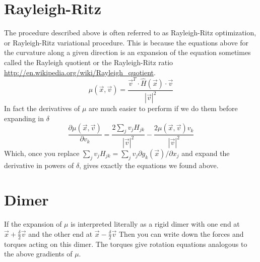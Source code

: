 \documentclass[a4paper]{article}
\begin{document}
\section{Rayleigh-Ritz}
The procedure described above is often referred to as Rayleigh-Ritz
optimization, or Rayleigh-Ritz variational procedure.  This is because the
equations above for the curvature along a given direction is an expansion of
the equation sometimes called the Rayleigh quotient or the Rayleigh-Ritz ratio
\url{http://en.wikipedia.org/wiki/Rayleigh_quotient}. 
\begin{equation}
  \mu(\vec{x}, \vec{v}) = \frac{\vec{v}^T \cdot \hat{H}(\vec{x}) \cdot \vec{v}  }{ | \vec{v} |^2}
\end{equation}
In fact the derivatives of $\mu$ are much easier to perform if we do them
before expanding in $\delta$
\begin{equation}
\frac{\partial \mu(\vec{x}, \vec{v})} {\partial v_k} = 
\frac{ 2 \sum_j v_j H_{jk}}{|\vec{v}|^2}
-
\frac{2 \mu(\vec{x}, \vec{v}) v_k}{|\vec{v}|^2}
\end{equation}
Which, once you replace $\sum_j v_j H_{jk} =  \sum_j v_j \partial g_k(\vec{x})
/ \partial x_j$ and expand the derivative in powers of $\delta$, gives exactly
the equations we found above.



\section{Dimer}
If the expansion of $\mu$ is interpreted literally as a rigid dimer with
one end at 
$\vec{x} + \frac{\delta}{2} \vec{v}$
and the other end at 
$\vec{x} - \frac{\delta}{2} \vec{v}$
Then you can write down the forces and torques acting on this dimer.  The
torques give rotation equations analogous to the above gradients of $\mu$.
\end{document}
